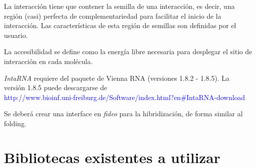 \documentclass[12pt,a4paper,spanish]{article}
\begin{document}
\begin{itemize}
            \par La interacción tiene que contener la semilla de una interacción, es decir, una región
             (casi) perfecta de complementariedad para facilitar el inicio de la interacción. Las
             características de esta región de semillas son definidas por el usuario.

            \par La accesibilidad se define como la energía libre necesaria para desplegar el sitio de
            interacción en cada molécula.

            \par \emph{IntaRNA} requiere del paquete de Vienna RNA (versiones 1.8.2 - 1.8.5). La versión
             1.8.5 puede descargarse de \\
             \textcolor{blue}{http://www.bioinf.uni-freiburg.de/Software/index.html?en\#IntaRNA-download}

\end{itemize}
		
Se deberá crear una interface en \emph{fideo} para la hibridización, de forma similar al folding.

\section{Bibliotecas existentes a utilizar}	
\end{document}
